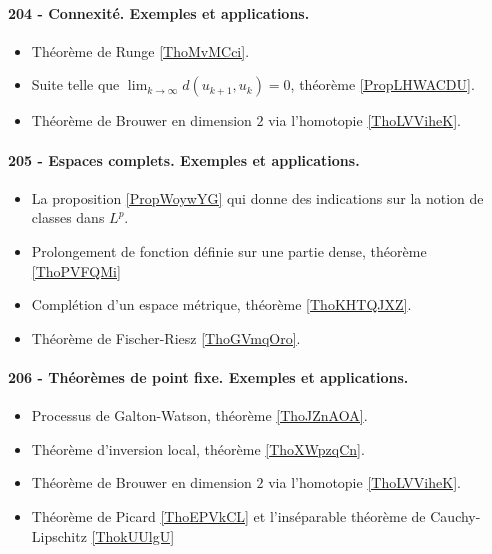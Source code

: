 \paragraph{204 - Connexité. Exemples et applications.}
\begin{itemize}
    \item Théorème de Runge \ref{ThoMvMCci}.
    \item Suite telle que \( \lim_{k\to \infty} d(u_{k+1},u_k)=0\), théorème \ref{PropLHWACDU}.
    \item Théorème de Brouwer en dimension \( 2\) via l'homotopie \ref{ThoLVViheK}.
\end{itemize}
\paragraph{205 - Espaces complets. Exemples et applications.}
\begin{itemize}
    \item La proposition \ref{PropWoywYG} qui donne des indications sur la notion de classes dans \( L^p\).
    \item Prolongement de fonction définie sur une partie dense, théorème \ref{ThoPVFQMi}
    \item Complétion d'un espace métrique, théorème \ref{ThoKHTQJXZ}.
    \item Théorème de Fischer-Riesz \ref{ThoGVmqOro}.
\end{itemize}
\paragraph{206 - Théorèmes de point fixe. Exemples et applications.}
\begin{itemize}
    \item Processus de Galton-Watson, théorème \ref{ThoJZnAOA}.
    \item Théorème d'inversion local, théorème \ref{ThoXWpzqCn}.
    \item Théorème de Brouwer en dimension \( 2\) via l'homotopie \ref{ThoLVViheK}.
    \item Théorème de Picard \ref{ThoEPVkCL} et l'inséparable théorème de Cauchy-Lipschitz \ref{ThokUUlgU}
\end{itemize}
